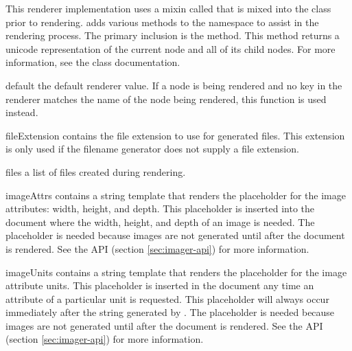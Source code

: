 This renderer implementation uses a mixin called  that
is mixed into the  class prior to rendering.  
adds various methods to the  namespace to assist in the
rendering process.  The primary inclusion is the 
method.  This method returns a unicode representation of the current node
and all of its child nodes.  For more information, see the 
class documentation.

\begin{memberdesc}[Renderer]{default}
the default renderer value.  If a node is being rendered and no key in
the renderer matches the name of the node being rendered, this 
function is used instead.
\end{memberdesc}

\begin{memberdesc}[Renderer]{fileExtension}
contains the file extension to use for generated files.  This extension is
only used if the filename generator does not supply a file extension.
\end{memberdesc}

\begin{memberdesc}[Renderer]{files}
a list of files created during rendering.
\end{memberdesc}

\begin{memberdesc}[Renderer]{imageAttrs}
contains a string template that renders the placeholder for the image 
attributes: width, height, and depth.  This placeholder is inserted into
the document where the width, height, and depth of an image is needed.
The placeholder is needed because images are not generated until after
the document is rendered.  See the  API 
(section \ref{sec:imager-api}) for more information.
\end{memberdesc}

\begin{memberdesc}[Renderer]{imageUnits}
contains a string template that renders the placeholder for the image 
attribute units.  This placeholder is inserted in the document any time
an attribute of a particular unit is requested.  This placeholder will
always occur immediately after the string generated by .
The placeholder is needed because images are not generated until after
the document is rendered.  See the  API 
(section \ref{sec:imager-api}) for more information.
\end{memberdesc}

